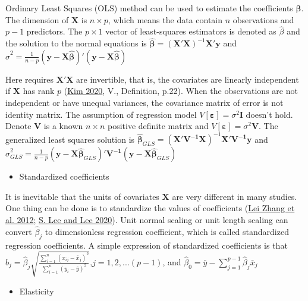 \documentclass[
  11pt,
  openany]{memoir}
\providecommand{\tightlist}{%
  \setlength{\itemsep}{0pt}\setlength{\parskip}{0pt}}
\begin{document}
Ordinary Least Squares (OLS) method can be used to estimate the coefficients \(\boldsymbol{\beta}\).
The dimension of \(\mathbf{X}\) is \(n\times p\), which means the data contain \(n\) observations and \(p-1\) predictors. The \(p\times1\) vector of least-squares estimators is denoted as \(\hat\beta\) and the solution to the normal equations is \(\boldsymbol{\hat\beta}=(\mathbf{X'X})^{-1}\mathbf{X'}\mathbf{y}\)
and \(\hat\sigma^2=\frac1{n-p}(\mathbf{y-X}\boldsymbol{\hat\beta})'(\mathbf{y-X}\boldsymbol{\hat\beta})\)

Here requires \(\mathbf{X'X}\) are invertible, that is, the covariates are linearly independent if \(\mathbf{X}\) has rank \(p\) (\protect\hyperlink{ref-kimLectureNotes2020}{Kim 2020}, V., Definition, p.22).
When the observations are not independent or have unequal variances, the covariance matrix of error is not identity matrix. The assumption of regression model \(V[\boldsymbol{\varepsilon}]=\sigma^2\mathbf{I}\) doesn't hold.
Denote \(\mathbf{V}\) is a known \(n\times n\) positive definite matrix and \(V[\boldsymbol{\varepsilon}]=\sigma^2\mathbf{V}\).
The generalized least squares solution is \(\boldsymbol{\hat\beta}_{GLS}=(\mathbf{X'V^{-1}X})^{-1}\mathbf{X'V^{-1}}\mathbf{y}\)
and \(\hat\sigma^2_{GLS}=\frac1{n-p}(\mathbf{y-X}\boldsymbol{\hat\beta}_{GLS})'\mathbf{V^{-1}}(\mathbf{y-X}\boldsymbol{\hat\beta}_{GLS})\)

\begin{itemize}
\tightlist
\item
  Standardized coefficients
\end{itemize}

It is inevitable that the units of covariates \(\mathbf{X}\) are very different in many studies. One thing can be done is to standardize the values of coefficients (\protect\hyperlink{ref-zhangHowBuiltEnvironment2012}{Lei Zhang et al. 2012}; \protect\hyperlink{ref-leeComparingImpactsLocal2020}{S. Lee and Lee 2020}).
Unit normal scaling or unit length scaling can convert \(\hat \beta_j\) to dimensionless regression coefficient, which is called standardized regression coefficients. A simple expression of standardized coefficients is that \(\hat b_j= \hat\beta_j\sqrt{\frac{\sum_{i=1}^{n}(x_{ij}-\bar x_j)^2}{\sum_{i=1}^{n}(y_{i}-\bar y)^2}}\),\(j=1,2,...(p-1)\), and
\(\hat\beta_0=\bar y - \sum_{j=1}^{p-1}\hat\beta_j\bar x_j\)

\begin{itemize}
\tightlist
\item
  Elasticity
\end{itemize}
\end{document}

